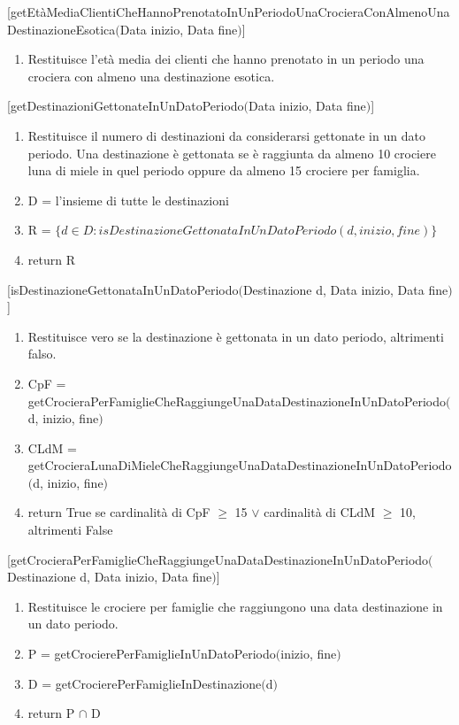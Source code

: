 \documentclass{article}
\begin{document}
[getEtàMediaClientiCheHannoPrenotatoInUnPeriodoUnaCrocieraConAlmenoUnaDestinazioneEsotica$($Data inizio, Data fine$)$]
\begin{enumerate}
    \item Restituisce l'età media dei clienti che hanno prenotato in un periodo una crociera con almeno una destinazione esotica.
\end{enumerate}
\space

[getDestinazioniGettonateInUnDatoPeriodo$($Data inizio, Data fine$)$]
\begin{enumerate}
    \item Restituisce il numero di destinazioni da considerarsi gettonate in un dato periodo. Una destinazione è gettonata se è raggiunta da almeno 10 crociere luna di miele in quel periodo oppure da almeno 15 crociere per famiglia.
    \item D = l'insieme di tutte le destinazioni
    \item R = $\{d \in D: isDestinazioneGettonataInUnDatoPeriodo(d, inizio, fine)\}$
    \item return R
\end{enumerate}
\space

[isDestinazioneGettonataInUnDatoPeriodo$($Destinazione d, Data inizio, Data fine$)$]
\begin{enumerate}
    \item Restituisce vero se la destinazione è gettonata in un dato periodo, altrimenti falso.
    \item CpF = getCrocieraPerFamiglieCheRaggiungeUnaDataDestinazioneInUnDatoPeriodo$($d, inizio, fine$)$
    \item CLdM = getCrocieraLunaDiMieleCheRaggiungeUnaDataDestinazioneInUnDatoPeriodo$($d, inizio, fine$)$
    \item return True se cardinalità di CpF $\geq$ 15 $\lor$ cardinalità di CLdM $\geq$ 10, altrimenti False
\end{enumerate}
\space

[getCrocieraPerFamiglieCheRaggiungeUnaDataDestinazioneInUnDatoPeriodo$($Destinazione d, Data inizio, Data fine$)$]
\begin{enumerate}
    \item Restituisce le crociere per famiglie che raggiungono una data destinazione in un dato periodo.
    \item P = getCrocierePerFamiglieInUnDatoPeriodo$($inizio, fine$)$
    \item D = getCrocierePerFamiglieInDestinazione$($d$)$
    \item return P $\cap$ D
\end{enumerate}
\space
\end{document}

